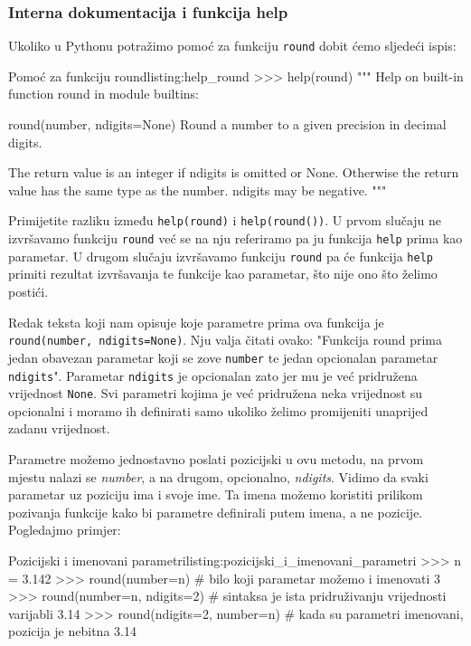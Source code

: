 \subsubsection{Interna dokumentacija i funkcija help}

Ukoliko u Pythonu potražimo pomoć za funkciju \texttt{round} dobit ćemo sljedeći ispis:

\begin{python}{Pomoć za funkciju round}{listing:help_round}
>>> help(round)
"""
Help on built-in function round in module builtins:

round(number, ndigits=None)
    Round a number to a given precision in decimal digits.

    The return value is an integer if ndigits is omitted or None.  Otherwise
    the return value has the same type as the number.  ndigits may be negative.
"""
\end{python}

Primijetite razliku između \texttt{help(round)} i \texttt{help(round())}. U prvom slučaju ne izvršavamo funkciju \texttt{round} već se na nju referiramo pa ju funkcija \texttt{help} prima kao parametar. U drugom slučaju izvršavamo funkciju \texttt{round} pa će funkcija \texttt{help} primiti rezultat izvršavanja te funkcije kao parametar, što nije ono što želimo postići.

Redak teksta koji nam opisuje koje parametre prima ova funkcija je \texttt{round(number, ndigits=None)}. Nju valja čitati ovako: "Funkcija round prima jedan obavezan parametar koji se zove \texttt{number} te jedan opcionalan parametar \texttt{ndigits}". Parametar \texttt{ndigits} je opcionalan zato jer mu je već pridružena vrijednost \texttt{None}. Svi parametri kojima je već pridružena neka vrijednost su opcionalni i moramo ih definirati samo ukoliko želimo promijeniti unaprijed zadanu vrijednost.

Parametre možemo jednostavno poslati pozicijski u ovu metodu, na prvom mjestu nalazi se \textit{number}, a na drugom, opcionalno, \textit{ndigits}. Vidimo da svaki parametar uz poziciju ima i svoje ime. Ta imena možemo koristiti prilikom pozivanja funkcije kako bi parametre definirali putem imena, a ne pozicije. Pogledajmo primjer:

\begin{python}{Pozicijski i imenovani parametri}{listing:pozicijski_i_imenovani_parametri}
>>> n = 3.142
>>> round(number=n)  # bilo koji parametar možemo i imenovati
3
>>> round(number=n, ndigits=2)  # sintaksa je ista pridruživanju vrijednosti varijabli
3.14
>>> round(ndigits=2, number=n)  # kada su parametri imenovani, pozicija je nebitna
3.14
\end{python}

